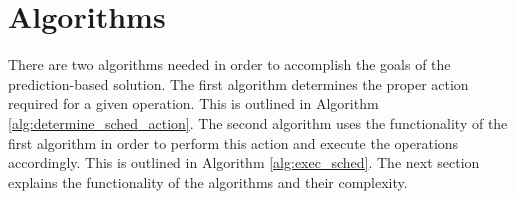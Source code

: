 \section{Algorithms}
\label{sec:algorithms}
There are two algorithms needed in order to accomplish the goals of the prediction-based solution. The first algorithm determines the proper action required for a given operation. This is outlined in Algorithm \ref{alg:determine_sched_action}. The second algorithm uses the functionality of the first algorithm in order to perform this action and execute the operations accordingly. This is outlined in Algorithm \ref{alg:exec_sched}. The next section explains the functionality of the algorithms and their complexity.